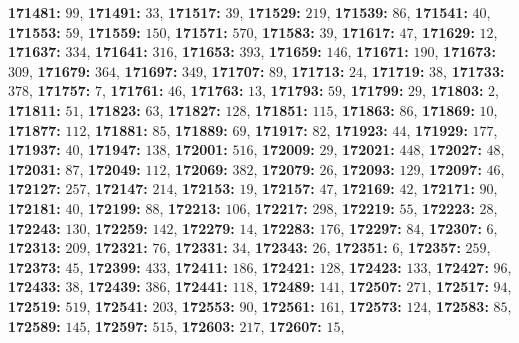 \textsf{\bfseries 171481:} $99$, \textsf{\bfseries 171491:} $33$, \textsf{\bfseries 171517:} $39$, \textsf{\bfseries 171529:} $219$, \textsf{\bfseries 171539:} $86$, \textsf{\bfseries 171541:} $40$, \textsf{\bfseries 171553:} $59$, \textsf{\bfseries 171559:} $150$, \textsf{\bfseries 171571:} $570$, \textsf{\bfseries 171583:} $39$, \textsf{\bfseries 171617:} $47$, \textsf{\bfseries 171629:} $12$, \textsf{\bfseries 171637:} $334$, \textsf{\bfseries 171641:} $316$, \textsf{\bfseries 171653:} $393$, \textsf{\bfseries 171659:} $146$, \textsf{\bfseries 171671:} $190$, \textsf{\bfseries 171673:} $309$, \textsf{\bfseries 171679:} $364$, \textsf{\bfseries 171697:} $349$, \textsf{\bfseries 171707:} $89$, \textsf{\bfseries 171713:} $24$, \textsf{\bfseries 171719:} $38$, \textsf{\bfseries 171733:} $378$, \textsf{\bfseries 171757:} $7$, \textsf{\bfseries 171761:} $46$, \textsf{\bfseries 171763:} $13$, \textsf{\bfseries 171793:} $59$, \textsf{\bfseries 171799:} $29$, \textsf{\bfseries 171803:} $2$, \textsf{\bfseries 171811:} $51$, \textsf{\bfseries 171823:} $63$, \textsf{\bfseries 171827:} $128$, \textsf{\bfseries 171851:} $115$, \textsf{\bfseries 171863:} $86$, \textsf{\bfseries 171869:} $10$, \textsf{\bfseries 171877:} $112$, \textsf{\bfseries 171881:} $85$, \textsf{\bfseries 171889:} $69$, \textsf{\bfseries 171917:} $82$, \textsf{\bfseries 171923:} $44$, \textsf{\bfseries 171929:} $177$, \textsf{\bfseries 171937:} $40$, \textsf{\bfseries 171947:} $138$, \textsf{\bfseries 172001:} $516$, \textsf{\bfseries 172009:} $29$, \textsf{\bfseries 172021:} $448$, \textsf{\bfseries 172027:} $48$, \textsf{\bfseries 172031:} $87$, \textsf{\bfseries 172049:} $112$, \textsf{\bfseries 172069:} $382$, \textsf{\bfseries 172079:} $26$, \textsf{\bfseries 172093:} $129$, \textsf{\bfseries 172097:} $46$, \textsf{\bfseries 172127:} $257$, \textsf{\bfseries 172147:} $214$, \textsf{\bfseries 172153:} $19$, \textsf{\bfseries 172157:} $47$, \textsf{\bfseries 172169:} $42$, \textsf{\bfseries 172171:} $90$, \textsf{\bfseries 172181:} $40$, \textsf{\bfseries 172199:} $88$, \textsf{\bfseries 172213:} $106$, \textsf{\bfseries 172217:} $298$, \textsf{\bfseries 172219:} $55$, \textsf{\bfseries 172223:} $28$, \textsf{\bfseries 172243:} $130$, \textsf{\bfseries 172259:} $142$, \textsf{\bfseries 172279:} $14$, \textsf{\bfseries 172283:} $176$, \textsf{\bfseries 172297:} $84$, \textsf{\bfseries 172307:} $6$, \textsf{\bfseries 172313:} $209$, \textsf{\bfseries 172321:} $76$, \textsf{\bfseries 172331:} $34$, \textsf{\bfseries 172343:} $26$, \textsf{\bfseries 172351:} $6$, \textsf{\bfseries 172357:} $259$, \textsf{\bfseries 172373:} $45$, \textsf{\bfseries 172399:} $433$, \textsf{\bfseries 172411:} $186$, \textsf{\bfseries 172421:} $128$, \textsf{\bfseries 172423:} $133$, \textsf{\bfseries 172427:} $96$, \textsf{\bfseries 172433:} $38$, \textsf{\bfseries 172439:} $386$, \textsf{\bfseries 172441:} $118$, \textsf{\bfseries 172489:} $141$, \textsf{\bfseries 172507:} $271$, \textsf{\bfseries 172517:} $94$, \textsf{\bfseries 172519:} $519$, \textsf{\bfseries 172541:} $203$, \textsf{\bfseries 172553:} $90$, \textsf{\bfseries 172561:} $161$, \textsf{\bfseries 172573:} $124$, \textsf{\bfseries 172583:} $85$, \textsf{\bfseries 172589:} $145$, \textsf{\bfseries 172597:} $515$, \textsf{\bfseries 172603:} $217$, \textsf{\bfseries 172607:} $15$, 
